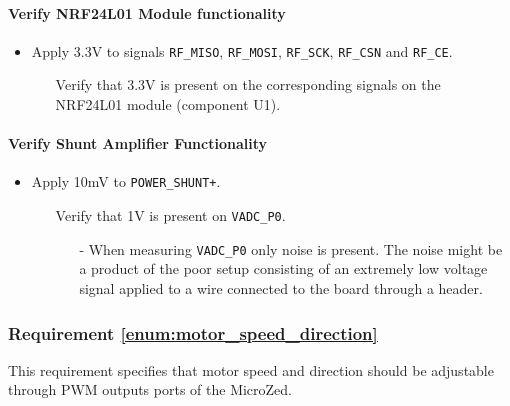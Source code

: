 \paragraph{Verify NRF24L01 Module functionality} %
\label{par:verify_nrf24l01_module_functionality}
\begin{itemize}
	\item Apply 3.3V to signals \texttt{RF\_MISO}, \texttt{RF\_MOSI}, \texttt{RF\_SCK}, \texttt{RF\_CSN} and \texttt{RF\_CE}.
	\begin{itemize}
		\item[\cmark] Verify that 3.3V is present on the corresponding signals on the NRF24L01 module (component U1).
	\end{itemize}
\end{itemize}

\paragraph{Verify Shunt Amplifier Functionality} %
\label{par:verify_shunt_amplifier_functionality}
\begin{itemize}
	\item Apply 10mV to \texttt{POWER\_SHUNT+}.
	\begin{itemize}
		\item[\xmark] Verify that 1V is present on \texttt{VADC\_P0}.
		\begin{itemize}
			\item[-] When measuring \texttt{VADC\_P0} only noise is present. 
			The noise might be a product of the poor setup consisting of an extremely low voltage signal applied to a wire connected to the board through a header. 
		\end{itemize}
	\end{itemize}
\end{itemize}


\subsubsection{Requirement \ref{enum:motor_speed_direction}} %
\label{subs:requirement_enum:motor_speed_direction}
This requirement specifies that motor speed and direction should be adjustable through PWM outputs
ports of the MicroZed.

